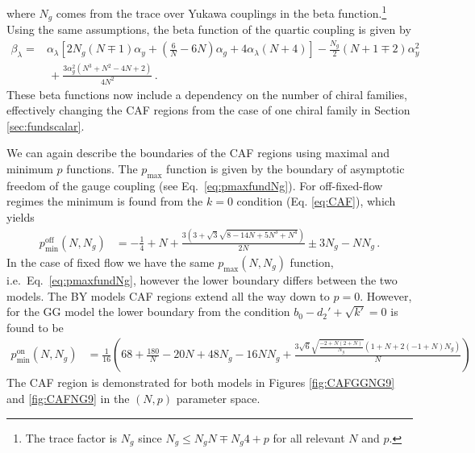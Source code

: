 where $N_g$ comes from the trace over Yukawa couplings in the beta function.\footnote{The trace factor is $N_g$ since $N_g \le N_gN\mp N_g4+p$ for all relevant  $N$ and $p$. } Using the same assumptions, the beta function of the quartic coupling is given by
\begin{align}
    \beta_{\lambda}=&\alpha_\lambda\left[2N_g(N\mp1)\alpha_y+\left(\frac{6}{N}-6N\right)\alpha_g+4 \alpha_\lambda (N+4)\right]-\frac{N_g}{2} (N+1\mp2)
  \alpha_y^2\nonumber\\&\,+\frac{3 \alpha_g^2 \left(N^3+N^2-4 N+2\right)}{4 N^2}\,.
\end{align}
These beta functions now include a dependency on the number of chiral families, effectively changing the CAF regions from the case of one chiral family in Section \ref{sec:fundscalar}.

We can again describe the boundaries of the CAF regions using maximal and minimum $p$ functions. The $p_{\max}$ function is given by the boundary of asymptotic freedom of the gauge coupling (see Eq.~\eqref{eq:pmaxfundNg}). For off-fixed-flow regimes the minimum is found from the $k=0$ condition (Eq. \eqref{eq:CAF}), which yields
\begin{align}
    p_{\min}^\text{off}(N,N_g)&= -\frac{1}{4} + N + \frac{3\left(3 + \sqrt{3}\sqrt{8 - 14N + 5N^3 + N^4}\right)}{2N} \pm 3N_g - N N_g\,.\label{eq:pminfundNg}
\end{align}
In the case of fixed flow we have the same $p_{\max}(N,N_g)$ function, i.e.\ Eq.~\eqref{eq:pmaxfundNg}, however the lower boundary differs between the two models. The BY models CAF regions extend all the way down to $p=0$. However, for the GG model the lower boundary from the condition $b_0-d_2'+\sqrt{k'}=0$ is found to be
\begin{align}
    p_{\min}^\text{on}(N,N_g)& = \frac{1}{16} \left( 68 + \frac{180}{N} - 20N + 48N_g - 16NN_g + \frac{3\sqrt{6}\sqrt{\frac{-2 + N(2+N)}{N_g}}(1 + N + 2(-1+N)N_g)}{N} \right)\label{eq:pminfundNgon}
\end{align}
The CAF region is demonstrated for both models in Figures  \ref{fig:CAFGGNG9} and \ref{fig:CAFNG9} in the $(N,p)$ parameter space.

